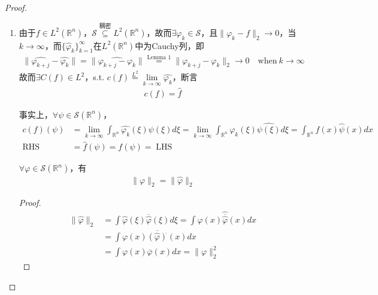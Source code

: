 \begin{proof}
\begin{enumerate}[leftmargin=1cm, label=(\arabic*)]
    \item 由于$f\in L^2(\mathbb{R}^n)$，$\mathcal{S}\overset{\text{稠密}}{\subseteq} L^2(\mathbb{R}^n)$，故而$\exists\varphi_k\in\mathcal{S}$，且$\|\varphi_k - f\|_2\to 0$，当$k\to\infty$，而$\{\widehat{\varphi}_k\}_{k=1}^{\infty}$在$L^2(\mathbb{R}^n)$中为Cauchy列，即
    \begin{align*}
        \|\widehat{\varphi_{k+j}} - \widehat{\varphi_k} \| = \| \widehat{\varphi_{k+j} - \varphi_k}\| \overset{\text{Lemma 1}}{=} \|\varphi_{k+j} - \varphi_k\|_2 \to 0 \quad \text{when}\ k\to\infty
    \end{align*}
    故而$\exists C(f)\in L^2$，s.t. $c(f) \overset{L^2}{=} \lim\limits_{k\to\infty} \widehat{\varphi_k}$，断言
    \begin{align*}
        c(f) = \widehat{f}
    \end{align*}

    事实上，$\forall\psi\in\mathcal{S}(\mathbb{R}^n)$，
    \begin{align*}
        c(f)(\psi) &= \lim\limits_{k\to\infty} \int_{\mathbb{R}^n} \widehat{\varphi_k}(\xi) \psi(\xi) d\xi = \lim\limits_{k\to\infty} \int_{\mathbb{R}^n} {\varphi_k}(\xi) \widehat{\psi(\xi)} d\xi = \int_{\mathbb{R}^n} f(x) \widehat{\psi}(x) dx \\
        \operatorname{RHS} &= \hat{f}(\psi) = f(\psi) = \operatorname{LHS}
    \end{align*}

    \begin{lemma}
        $\forall \varphi\in\mathcal{S}(\mathbb{R}^n)$，有
        \begin{align*}
            \|\varphi\|_2 = \|\widehat{\varphi}\|_2
        \end{align*}
    \end{lemma}
    \begin{proof}
        \begin{align*}
            \|\widehat{\varphi}\|_2 &= \int \widehat{\varphi}(\xi)\overline{\widehat{\varphi}}(\xi) d\xi = \int \varphi(x) \widehat{\overline{\widehat{\varphi}}}(x) dx \\
            &= \int \varphi(x) \overline{\left(\widehat{\varphi}\right)^{\check{}}}(x) dx \\
            & = \int\varphi(x) \overline{\varphi}(x) dx = \|\varphi\|_2^2
        \end{align*}


\end{proof}
\end{enumerate}
\end{proof}
